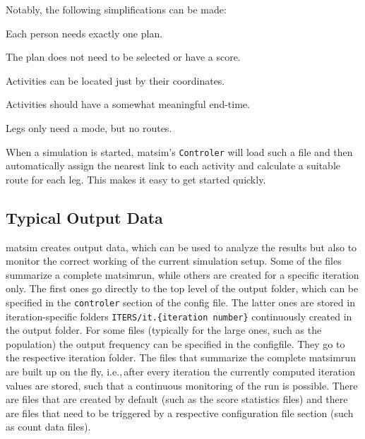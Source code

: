 Notably, the following simplifications can be made:
\begin{compactitem}
\item Each person needs exactly one plan.
\item The plan does not need to be selected or have a score.
\item Activities can be located just by their coordinates.
\item Activities should have a somewhat meaningful end-time.
\item Legs only need a mode, but no routes.
\end{compactitem}
When a simulation is started, \gls{matsim}'s \lstinline|Controler| will load such a file and then automatically assign the nearest link to each activity and calculate a suitable route for each leg. This makes it easy to get started quickly. 

\subsection{Typical Output Data}
\label{sec:outputdata}
\gls{matsim} creates
output data, which can be used to analyze the results but also to monitor the correct working of the current simulation setup. Some of the files summarize a complete \gls{matsimrun}, while others are created for a specific \gls{iteration} only. The first ones go directly to the top level of the output folder, which can be specified in the \lstinline|controler| section of the config file. The latter ones are stored in iteration-specific folders \lstinline|ITERS/it.{iteration number}| continuously created in the output folder. For some files (typically for the large ones, such as the population) the output frequency can be specified in the \gls{configfile}. They go to the respective iteration folder. The files that summarize the complete \gls{matsimrun} are built up on the fly, i.e.,\,after every iteration the currently computed iteration values are stored, such that a continuous monitoring of the run is possible. There are files that are created by default (such as the score statistics files) and there are files that need to be triggered by a respective configuration file section (such as count data files).


